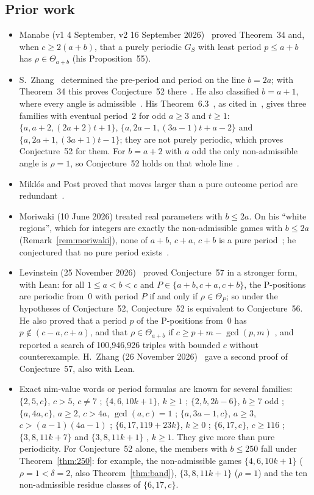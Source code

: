 \documentclass[11pt]{amsart}
\theoremstyle{definition}
\numberwithin{equation}{section}
\newcommand{\Th}[1]{\Theta_{#1}}
\begin{document}
\subsection{Prior work}
\begin{itemize}
\item Manabe (v1 4 September, v2 16 September 2026)~\cite{Manabe} proved Theorem~34 and, when
$c\ge2(a+b)$, that a purely periodic $G_S$ with least period $p\le a+b$ has
$\rho\in\Th{a+b}$ (his Proposition~55).
\item S.~Zhang~\cite[Prop.~3.1]{SZhang} determined the pre-period and period on the line
$b=2a$; with Theorem~34 this proves Conjecture~52 there~\cite[\S6]{Manabe}. He also
classified $b=a+1$, where every angle is admissible~\cite[Prop.~4.1]{SZhang}. His
Theorem~6.3~\cite{SZhang}, as cited in~\cite[\S6]{Manabe}, gives three families with
eventual period~$2$ for odd $a\ge3$ and $t\ge1$: $\{a,a+2,(2a+2)t+1\}$,
$\{a,2a-1,(3a-1)t+a-2\}$ and $\{a,2a+1,(3a+1)t-1\}$; they are not purely periodic, which
proves Conjecture~52 for them. For $b=a+2$ with $a$ odd the only non-admissible angle is
$\rho=1$, so Conjecture~52 holds on that whole line~\cite[\S6]{Manabe}.
\item Mikl\'os and Post proved that moves larger than a pure outcome period are
redundant~\cite[Prop.~2.9]{MP}.
\item Moriwaki (10 June 2026) treated real parameters with $b\le 2a$. On his ``white
regions'', which for integers are exactly the non-admissible games with $b\le 2a$
(Remark~\ref{rem:moriwaki}), none of $a+b$, $c+a$, $c+b$ is a pure
period~\cite[Thm.~3]{Moriwaki}; he conjectured that no pure period
exists~\cite[Remark~5, \S5(1)]{Moriwaki}.
\item Levinstein (25 November 2026)~\cite{Levinstein} proved Conjecture~57 in a stronger
form, with Lean: for all $1\le a<b<c$ and $P\in\{a+b,c+a,c+b\}$, the P-positions are
periodic from~$0$ with period $P$ if and only if $\rho\in\Th{P}$; so under the
hypotheses of Conjecture~52, Conjecture~52 is equivalent to Conjecture~56. He also proved that
a period $p$ of the P-positions from~$0$ has $p\notin(c-a,c+a)$, and that $\rho\in\Th{a+b}$
if $c\ge p+m-\gcd(p,m)$ \cite[Prop.~3.1]{Levinstein}, and reported a search of
100{,}946{,}926 triples with bounded $c$ without counterexample. H.~Zhang (26 November 2026)~\cite{HZhang} gave a
second proof of Conjecture~57, also with Lean.
\item Exact nim-value words or period formulas are known for several families:
$\{2,5,c\}$, $c>5$, $c\ne7$ \cite{Zeng}; $\{4,6,10k+1\}$, $k\ge1$ \cite{XZeng};
$\{2,b,2b-6\}$, $b\ge7$ odd \cite{Jo}; $\{a,4a,c\}$, $a\ge2$, $c>4a$, $\gcd(a,c)=1$
\cite{A4AC}; $\{a,3a-1,c\}$, $a\ge3$, $c>(a-1)(4a-1)$ \cite{Brink1}; $\{6,17,119+23k\}$,
$k\ge0$ \cite{Brink2}; $\{6,17,c\}$, $c\ge116$ \cite[Thm.~12]{Pan}; $\{3,8,11k+7\}$
\cite{CL} and $\{3,8,11k+1\}$ \cite{CL1}, $k\ge1$. They give more than pure periodicity. For
Conjecture~52 alone, the members with $b\le250$ fall under Theorem~\ref{thm:250}: for
example, the non-admissible games $\{4,6,10k+1\}$ ($\rho=1<\delta=2$, also
Theorem~\ref{thm:band}), $\{3,8,11k+1\}$ ($\rho=1$) and the ten non-admissible residue
classes of $\{6,17,c\}$.
\end{itemize}
\end{document}
